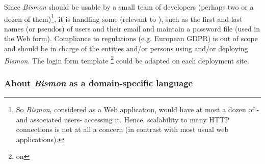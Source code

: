 \begin{itemize}
      Since \textit{Bismon} should be usable by a small team of
      developers (perhaps two or a dozen of them)\footnote{So
        \textit{Bismon}, considered as a Web application, would have
        at most a dozen of  -and associated users- accessing
        it. Hence, scalability to many HTTP connections is not at all
        a concern (in contrast with most usual web applications).}, it
      is handling some  (relevant
      to ), such as the first and last names (or
      pseudos) of users and their email and maintain a password file
      (used in the Web  form). Compliance to
      regulations (e.g. European GDPR) is out of scope and should be
      in charge of the entities and/or persons using and/or deploying
      \textit{Bismon}. The login form template \footnote{on
        }
      could be adapted on each deployment site.
\end{itemize}


\subsubsection{About \emph{Bismon} as a domain-specific language}

